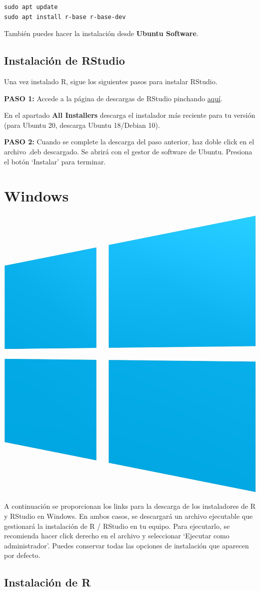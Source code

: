 \documentclass[
  degree=mecinf,
  title=normal,
  toc=normal,
  bib=normal]{mnye}
\begin{document}
\begin{verbatim}
sudo apt update
sudo apt install r-base r-base-dev 
\end{verbatim}

También puedes hacer la instalación desde \textbf{Ubuntu Software}.

\hypertarget{instalaciuxf3n-de-rstudio}{%
\subsection{Instalación de RStudio}\label{instalaciuxf3n-de-rstudio}}

Una vez instalado R, sigue los siguientes pasos para instalar RStudio.

\textbf{PASO 1: }
Accede a la página de descargas de RStudio pinchando \href{https://rstudio.com/products/rstudio/download/\#download}{aquí}.

En el apartado \textbf{All Installers} descarga el instalador más reciente para tu versión (para Ubuntu 20, descarga Ubuntu 18/Debian 10).

\textbf{PASO 2: }
Cuando se complete la descarga del paso anterior, haz doble click en el archivo .deb descargado. Se abrirá con el gestor de software de Ubuntu. Presiona el botón `Instalar' para terminar.

\hypertarget{windows}{%
\section{Windows}\label{windows}}

\begin{center}\includegraphics[width=0.15\linewidth]{images/os/windows} \end{center}

A continuación se proporcionan los links para la descarga de los instaladores de R y RStudio en Windows. En ambos casos, se descargará un archivo ejecutable que gestionará la instalación de R / RStudio en tu equipo. Para ejecutarlo, se recomienda hacer click derecho en el archivo y seleccionar `Ejecutar como administrador'. Puedes conservar todas las opciones de instalación que aparecen por defecto.

\hypertarget{instalaciuxf3n-de-r-1}{%
\subsection{Instalación de R}\label{instalaciuxf3n-de-r-1}}
\end{document}
